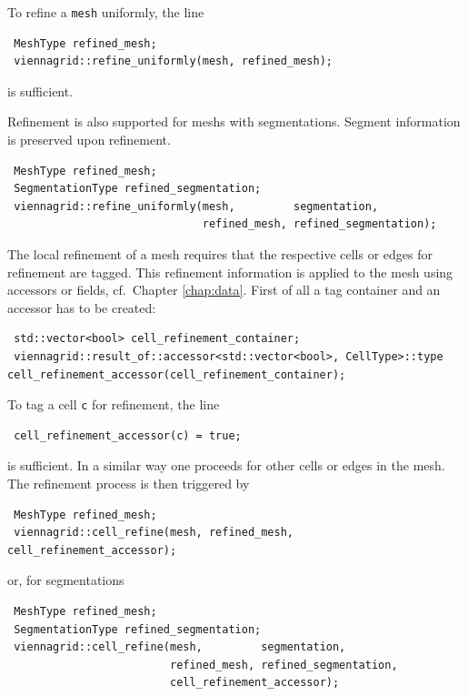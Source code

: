  To refine a \lstinline|mesh| uniformly, the line
 \begin{lstlisting}
 MeshType refined_mesh;
 viennagrid::refine_uniformly(mesh, refined_mesh);
 \end{lstlisting}
 is sufficient.

 Refinement is also supported for meshs with segmentations. Segment information is preserved upon refinement.
 \begin{lstlisting}
 MeshType refined_mesh;
 SegmentationType refined_segmentation;
 viennagrid::refine_uniformly(mesh,         segmentation,
                              refined_mesh, refined_segmentation);
 \end{lstlisting}

 The local refinement of a mesh requires that the respective cells or edges for refinement are tagged. This refinement information is applied to the mesh using accessors or fields, cf.~Chapter \ref{chap:data}.
 First of all a tag container and an accessor has to be created:
 \begin{lstlisting}
 std::vector<bool> cell_refinement_container;
 viennagrid::result_of::accessor<std::vector<bool>, CellType>::type cell_refinement_accessor(cell_refinement_container);
 \end{lstlisting}


 To tag a cell \lstinline|c| for refinement, the line
 \begin{lstlisting}
 cell_refinement_accessor(c) = true;
 \end{lstlisting}
 is sufficient. In a similar way one proceeds for other cells or edges in the mesh. The refinement process is then triggered by
 \begin{lstlisting}
 MeshType refined_mesh;
 viennagrid::cell_refine(mesh, refined_mesh, cell_refinement_accessor);
 \end{lstlisting}

 or, for segmentations
 \begin{lstlisting}
 MeshType refined_mesh;
 SegmentationType refined_segmentation;
 viennagrid::cell_refine(mesh,         segmentation,
                         refined_mesh, refined_segmentation,
                         cell_refinement_accessor);
 \end{lstlisting}


